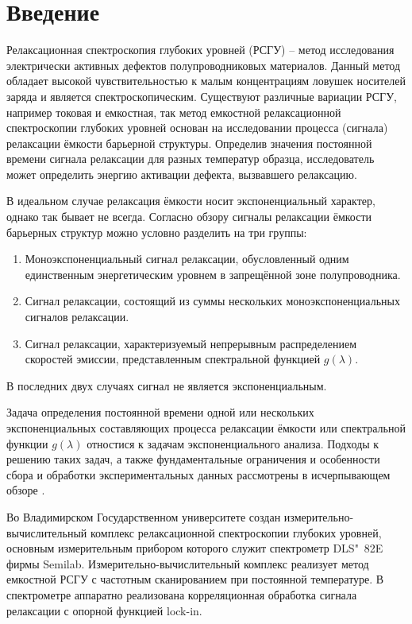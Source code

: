 \section{Введение}
Релаксационная спектроскопия глубоких уровней (РСГУ) -- метод исследования 
электрически активных дефектов полупроводниковых материалов. Данный метод 
обладает высокой чувствительностью к малым концентрациям ловушек носителей 
заряда и является спектроскопическим. Существуют различные вариации РСГУ, 
например токовая и емкостная, так метод емкостной релаксационной спектроскопии 
глубоких уровней основан на исследовании процесса (сигнала) релаксации ёмкости 
барьерной структуры. Определив значения постоянной времени сигнала релаксации 
для разных температур образца, исследователь может определить энергию активации 
дефекта, вызвавшего релаксацию. 

В идеальном случае релаксация ёмкости носит экспоненциальный характер, однако 
так бывает не всегда. Согласно обзору \cite{istratov_exp_analysis} сигналы 
релаксации ёмкости барьерных структур можно условно разделить на три группы:
    \begin{enumerate}
        \item Моноэкспоненциальный сигнал релаксации, обусловленный одним 
        единственным энергетическим уровнем в запрещённой зоне полупроводника.
        \item Сигнал релаксации, состоящий из суммы нескольких 
        моноэкспоненциальных сигналов релаксации.
        \item Сигнал релаксации, характеризуемый непрерывным распределением 
        скоростей эмиссии, представленным спектральной функцией $g(\lambda)$.
    \end{enumerate}
В последних двух случаях сигнал не является экспоненциальным. 

Задача определения постоянной времени одной или нескольких экспоненциальных 
составляющих процесса релаксации ёмкости или спектральной функции $g(\lambda)$ 
отностися к задачам экспоненциального анализа. Подходы к решению таких задач,
а также фундаментальные ограничения и особенности сбора и обработки 
экспериментальных данных рассмотрены в исчерпывающем обзоре 
\cite{istratov_exp_analysis}.

Во Владимирском Государственном университете создан измерительно-вычислительный
комплекс релаксационной спектроскопии глубоких уровней, основным измерительным
прибором которого служит спектрометр DLS"~82E фирмы Semilab. 
Измерительно-вычислительный комплекс реализует метод емкостной РСГУ с частотным
сканированием при постоянной температуре. В спектрометре аппаратно реализована
корреляционная обработка сигнала релаксации с опорной функцией lock-in. 

